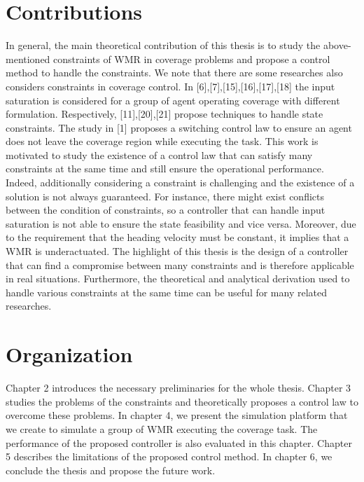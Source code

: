\section{Contributions}
In general, the main theoretical contribution of this thesis is to study the above-mentioned constraints of WMR in coverage problems and propose a control method to handle the constraints. We note that there are some researches also considers constraints in coverage control. In [6],[7],[15],[16],[17],[18] the input saturation is considered for a group of agent operating coverage with different formulation. Respectively, [11],[20],[21] propose techniques to handle state constraints. The study in [1] proposes a switching control law to ensure an agent does not leave the coverage region while executing the task. This work is motivated to study the existence of a control law that can satisfy many constraints at the same time and still ensure the operational performance. Indeed, additionally considering a constraint is challenging and the existence of a solution is not always guaranteed. For instance, there might exist conflicts between the condition of constraints, so a controller that can handle input saturation is not able to ensure the state feasibility and vice versa. Moreover, due to the requirement that the heading velocity must be constant, it implies that a WMR is underactuated. The highlight of this thesis is the design of a controller that can find a compromise between many constraints and is therefore applicable in real situations. Furthermore, the theoretical and analytical derivation used to handle various constraints at the same time can be useful for many related researches. 
\section{Organization}
Chapter 2 introduces the necessary preliminaries for the whole thesis. Chapter 3 studies the problems of the constraints and theoretically proposes a control law to overcome these problems. In chapter 4, we present the simulation platform that we create to simulate a group of WMR executing the coverage task. The performance of the proposed controller is also evaluated in this chapter. Chapter 5 describes the limitations of the proposed control method. In chapter 6, we conclude the thesis and propose the future work.







